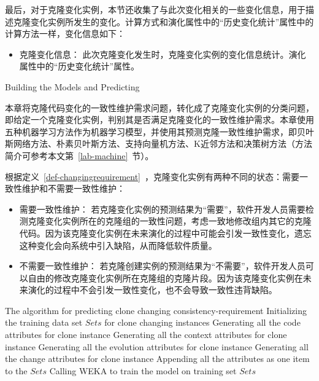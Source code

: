 最后，对于克隆变化实例，本节还收集了与此次变化相关的一些变化信息，用于描述克隆变化实例所发生的变化。计算方式和演化属性中的“历史变化统计”属性中的计算方法一样，变化信息如下：

\begin {itemize}
\item
克隆变化信息：
此次克隆变化发生时，克隆变化实例的变化信息统计。演化属性中的“历史变化统计”属性。
\end {itemize}


{Building the Models and Predicting} 

本章将克隆代码变化的一致性维护需求问题，转化成了克隆变化实例的分类问题，即给定一个克隆变化实例，判别其是否满足克隆变化的一致性维护需求。本章使用五种机器学习方法作为机器学习模型，并使用其预测克隆一致性维护需求，即贝叶斯网络方法、朴素贝叶斯方法、支持向量机方法、K近邻方法和决策树方法（方法简介可参考本文第~\ref{lab-machine}~节）。

根据定义~\ref{def-changingrequirement}~，克隆变化实例有两种不同的状态：需要一致性维护和不需要一致性维护：
\begin{itemize}
\item 
需要一致性维护：
若克隆变化实例的预测结果为“需要”，软件开发人员需要检测克隆变化实例所在的克隆组的一致性问题，考虑一致地修改组内其它的克隆代码。因为该克隆变化实例在未来演化的过程中可能会引发一致性变化，遗忘这种变化会向系统中引入缺陷，从而降低软件质量。
\item
不需要一致性维护：
若克隆创建实例的预测结果为“不需要”，软件开发人员可以自由的修改克隆变化实例所在克隆组的克隆片段。因为该克隆变化实例在未来演化的过程中不会引发一致性变化，也不会导致一致性违背缺陷。
\end{itemize}

\vspace{1em}
\begin{minipage}{0.8\textwidth}
\centering
\begin{algorithm}[H]
 {The algorithm for predicting clone changing consistency-requirement}
\label{alg-changingperdition}
Initializing the training data set $Sets$ for clone changing instances\; 
{ 
Generating all the code attributes for clone instance\;
Generating all the context attributes for clone instance\;
Generating all the evolution attributes for clone instance\;
Generating all the change attributes for clone instance\;
Appending all the attributes as one item to the $Sets$\;
}
Calling WEKA to train the model on training set $Sets$\;
\end{algorithm}
\end{minipage}
\vspace{1em}


